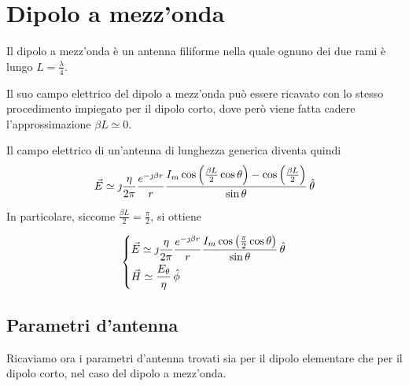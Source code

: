 \section{Dipolo a mezz'onda}

Il dipolo a mezz'onda è un antenna filiforme nella quale ognuno dei due rami è lungo $L = \frac{\lambda}{4}$.

Il suo campo elettrico del dipolo a mezz'onda può essere ricavato con lo stesso procedimento impiegato per il dipolo corto, dove però viene fatta cadere l'approssimazione $\beta L \simeq 0$.

Il campo elettrico di un'antenna di lunghezza generica diventa quindi
\begin{equation*}
	\vec{E}
	\simeq \jmath \frac{\eta}{2 \pi} \frac{e^{-\jmath \beta r}}{r} \frac{I_m \cos \left(\frac{\beta L}{2} \cos \theta \right) - \cos \left(\frac{\beta L}{2} \right)}{\sin \theta} \,\hat{\theta}
\end{equation*}

In particolare, siccome $\frac{\beta L}{2} = \frac{\pi}{2}$, si ottiene

\begin{equation}\begin{dcases}
	\vec{E} \simeq \jmath \frac{\eta}{2 \pi} \frac{e^{-\jmath \beta r}}{r} \frac{I_m \cos \left(\frac{\pi}{2} \cos \theta \right)}{\sin \theta} \,\hat{\theta} \\
	\vec{H} \simeq \frac{E_{\theta}}{\eta} \,\hat{\phi}
\end{dcases}\end{equation}

\subsection{Parametri d'antenna}
Ricaviamo ora i parametri d'antenna trovati sia per il dipolo elementare che per il dipolo corto, nel caso del dipolo a mezz'onda.

